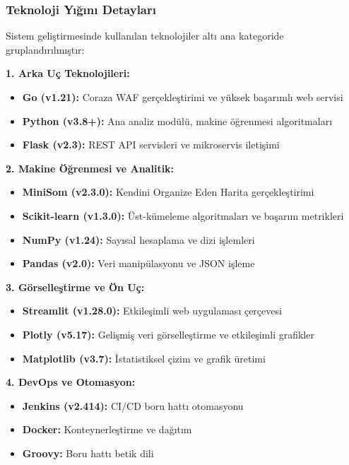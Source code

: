 \newpage

\subsubsection{Teknoloji Yığını Detayları}

Sistem geliştirmesinde kullanılan teknolojiler altı ana kategoride gruplandırılmıştır:

\textbf{1. Arka Uç Teknolojileri:}
\begin{itemize}
    \item \textbf{Go (v1.21):} Coraza WAF gerçekleştirimi ve yüksek başarımlı web servisi
    \item \textbf{Python (v3.8+):} Ana analiz modülü, makine öğrenmesi algoritmaları
    \item \textbf{Flask (v2.3):} REST API servisleri ve mikroservis iletişimi
\end{itemize}

\textbf{2. Makine Öğrenmesi ve Analitik:}
\begin{itemize}
    \item \textbf{MiniSom (v2.3.0):} Kendini Organize Eden Harita gerçekleştirimi \cite{minisom2017}
    \item \textbf{Scikit-learn (v1.3.0):} Üst-kümeleme algoritmaları ve başarım metrikleri
    \item \textbf{NumPy (v1.24):} Sayısal hesaplama ve dizi işlemleri
    \item \textbf{Pandas (v2.0):} Veri manipülasyonu ve JSON işleme
\end{itemize}

\textbf{3. Görselleştirme ve Ön Uç:}
\begin{itemize}
    \item \textbf{Streamlit (v1.28.0):} Etkileşimli web uygulaması çerçevesi \cite{streamlit2023}
    \item \textbf{Plotly (v5.17):} Gelişmiş veri görselleştirme ve etkileşimli grafikler \cite{plotly2015}
    \item \textbf{Matplotlib (v3.7):} İstatistiksel çizim ve grafik üretimi
\end{itemize}

\textbf{4. DevOps ve Otomasyon:}
\begin{itemize}
    \item \textbf{Jenkins (v2.414):} CI/CD boru hattı otomasyonu
    \item \textbf{Docker:} Konteynerleştirme ve dağıtım
    \item \textbf{Groovy:} Boru hattı betik dili
\end{itemize}

